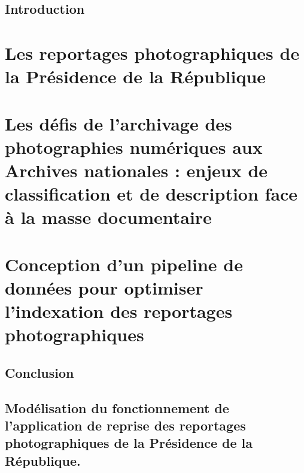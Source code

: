 \documentclass[a4paper,12pt,twoside]{book}
\begin{document}
	\chapter*{Introduction}	


\newpage{\pagestyle{empty}\cleardoublepage}

	\mainmatter

	\part{Les reportages photographiques de la Présidence de la République}


	

	
	\part{Les défis de l'archivage des photographies numériques aux Archives nationales : enjeux de classification et de description face à la masse documentaire}


	


    \part{Conception d’un pipeline de données pour optimiser l’indexation des reportages photographiques}
	

	

	
	\chapter*{Conclusion}
\label{sec:conclusion}


\newpage{\pagestyle{empty}\cleardoublepage}
	

\appendix %


\chapter[Annexe 1]{Modélisation du fonctionnement de l'application de reprise des reportages photographiques de la Présidence de la République.}
\label{sec:annexe1}
\end{document}

